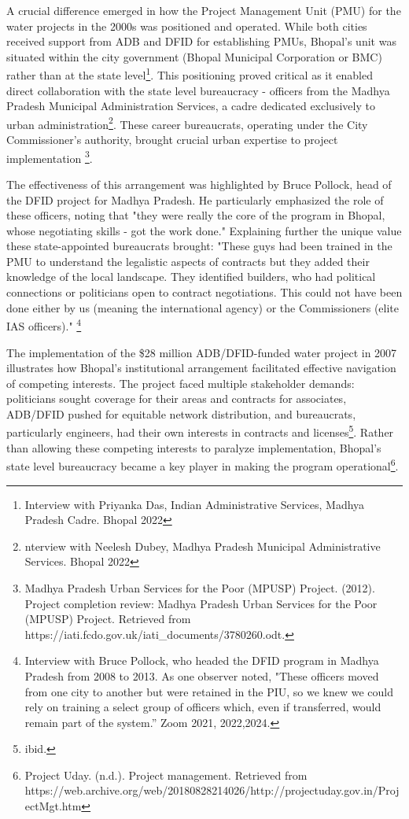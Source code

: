 A crucial difference emerged in how the Project Management Unit (PMU) for the water projects in the 2000s was positioned and operated. While both cities received support from ADB and DFID for establishing PMUs, Bhopal's unit was situated within the city government (Bhopal Municipal Corporation or BMC) rather than at the state level\footnote{Interview with Priyanka Das, Indian Administrative Services, Madhya Pradesh Cadre. Bhopal 2022}. This positioning proved critical as it enabled direct collaboration with the state level bureaucracy - officers from the Madhya Pradesh Municipal Administration Services, a cadre dedicated exclusively to urban administration\footnote{nterview with Neelesh Dubey, Madhya Pradesh Municipal Administrative Services. Bhopal 2022
}. These career bureaucrats, operating under the City Commissioner's authority, brought crucial urban expertise to project implementation \footnote{Madhya Pradesh Urban Services for the Poor (MPUSP) Project. (2012). Project completion review: Madhya Pradesh Urban Services for the Poor (MPUSP) Project. Retrieved from https://iati.fcdo.gov.uk/iati_documents/3780260.odt.}.

The effectiveness of this arrangement was highlighted by Bruce Pollock,  head of the DFID project for Madhya Pradesh. He particularly emphasized the role of these officers, noting that "they were really the core of the program in Bhopal, whose negotiating skills - got the work done." Explaining further the unique value these state-appointed bureaucrats brought: "These guys had been trained in the PMU to understand the legalistic aspects of contracts but they added their knowledge of the local landscape. They identified builders, who had political connections or politicians open to contract negotiations. This could not have been done either by us (meaning the international agency) or the Commissioners (elite IAS officers)." \footnote{Interview with Bruce Pollock, who headed the DFID program in Madhya Pradesh from 2008 to 2013. As one observer noted, "These officers moved from one city to another but were retained in the PIU, so we knew we could rely on training a select group of officers which, even if transferred, would remain part of the system.” Zoom 2021, 2022,2024.
}

The implementation of the \$28 million ADB/DFID-funded water project in 2007 illustrates how Bhopal's institutional arrangement facilitated effective navigation of competing interests. The project faced multiple stakeholder demands: politicians sought coverage for their areas and contracts for associates, ADB/DFID pushed for equitable network distribution, and bureaucrats, particularly engineers, had their own interests in contracts and licenses\footnote{ibid.}. Rather than allowing these competing interests to paralyze implementation, Bhopal's state level bureaucracy became a key player in making the program operational\footnote{Project Uday. (n.d.). Project management. Retrieved from https://web.archive.org/web/20180828214026/http://projectuday.gov.in/ProjectMgt.htm}.

